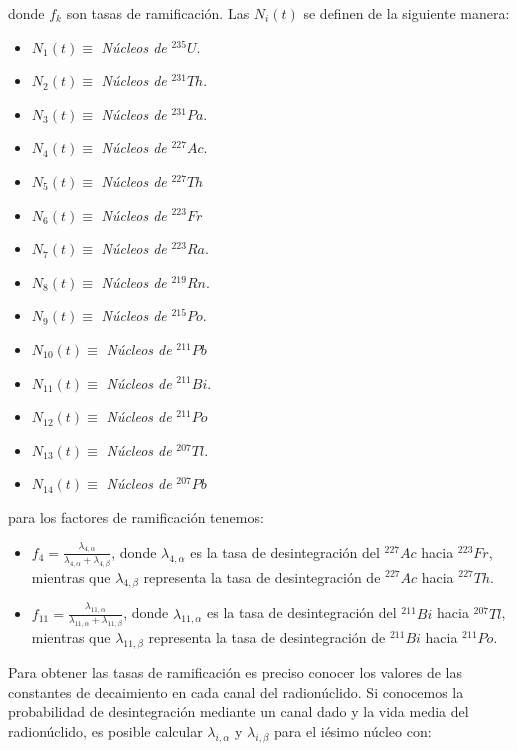 \noindent donde $f_k$ son tasas de ramificación. Las $N_i(t)$ se definen de la siguiente manera:
\begin{itemize}
    \item $N_1(t)\equiv$ \textit{Núcleos de} $^{235}U$.
    \item $N_2(t)\equiv$ \textit{Núcleos de} $^{231}Th$.
    \item $N_3(t)\equiv$ \textit{Núcleos de} $^{231}Pa$.
    \item $N_4(t)\equiv$ \textit{Núcleos de} $^{227}Ac$.
    \item $N_5(t)\equiv$ \textit{Núcleos de} $^{227}Th$
    \item $N_6(t)\equiv$ \textit{Núcleos de} $^{223}Fr$
    \item $N_7(t)\equiv$ \textit{Núcleos de} $^{223}Ra$.
    \item $N_8(t)\equiv$ \textit{Núcleos de} $^{219}Rn$.
    \item $N_9(t)\equiv$ \textit{Núcleos de} $^{215}Po$.
    \item $N_{10}(t)\equiv$ \textit{Núcleos de} $^{211}Pb$
    \item $N_{11}(t)\equiv$ \textit{Núcleos de} $^{211}Bi$.
    \item $N_{12}(t)\equiv$ \textit{Núcleos de} $^{211}Po$
    \item $N_{13}(t)\equiv$ \textit{Núcleos de} $^{207}Tl$.
    \item $N_{14}(t)\equiv$ \textit{Núcleos de} $^{207}Pb$
\end{itemize}

\noindent para los factores de ramificación tenemos:
\begin{itemize}
    \item $f_4=\frac{\lambda_{4,\alpha}}{\lambda_{4,\alpha}+\lambda_{4,\beta}}$, donde $\lambda_{4,\alpha}$ es la tasa de desintegración del $^{227}Ac$ hacia $^{223}Fr$, mientras que $\lambda_{4,\beta}$ representa la tasa de desintegración de $^{227}Ac$ hacia $^{227}Th$. 
    \item $f_{11}=\frac{\lambda_{11,\alpha}}{\lambda_{11,\alpha}+\lambda_{11,\beta}}$, donde $\lambda_{11,\alpha}$ es la tasa de desintegración del $^{211} Bi$ hacia $^{207} Tl$, mientras que $\lambda_{11,\beta}$ representa la tasa de desintegración de $^{211} Bi$ hacia $^{211} Po$.
\end{itemize}

Para obtener las tasas de ramificación es preciso conocer los valores de las constantes de decaimiento en cada canal del radionúclido. Si conocemos la probabilidad de desintegración mediante un canal dado y la vida media del radionúclido, es posible calcular $\lambda_{i,\alpha}$ y $\lambda_{i,\beta}$ para el iésimo núcleo con:

